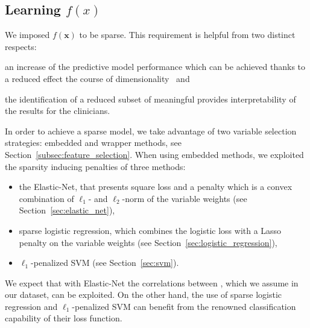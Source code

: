 \subsection{Learning $f(x)$} \label{sec:learning_f}


We imposed $f(\bm{x})$ to be sparse. This requirement is helpful from two distinct respects:
\begin{enumerate*}[label=(\roman*)]
	\item an increase of the predictive model performance which can be achieved thanks to a reduced effect the course of dimensionality~\cite{hastie2015statistical} and
	\item the identification of a reduced subset of meaningful \PCOs provides interpretability of the results for the clinicians.
\end{enumerate*}

In order to achieve a sparse model, we take advantage of two variable selection strategies: embedded and wrapper methods, see Section~\ref{subsec:feature_selection}.
When using embedded methods, we exploited the sparsity inducing penalties of three methods:
\begin{itemize}
	\item the Elastic-Net, that presents square loss and a penalty which is a convex combination of $\ell_1$- and $\ell_2$-norm of the variable weights (see Section~\ref{sec:elastic_net}),

	\item sparse logistic regression, which combines the logistic loss with a Lasso penalty on the variable weights (see Section~\ref{sec:logistic_regression}),
	
	\item $\ell_1$-penalized SVM (see Section~\ref{sec:svm}).
\end{itemize}
We expect that with Elastic-Net the correlations between \PCOs, which we assume in our dataset, can be exploited. On the other hand, the use of sparse logistic regression and $\ell_1$-penalized SVM can benefit from the renowned classification capability of their loss function.

